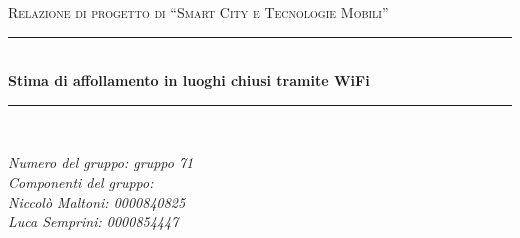 \begin{titlepage}
  \newcommand{\HRule}{\rule{\linewidth}{0.5mm}}

  \center

  \textsc{\Large Relazione di progetto di ``Smart City e Tecnologie Mobili''}\\[0.5cm]

  \HRule \\[0.4cm]
  { \huge \bfseries Stima di affollamento in luoghi chiusi tramite WiFi}\\[0.4cm]
  \HRule \\[1.5cm]

  \vfill

  \begin{flushleft}
  \emph{Numero del gruppo: gruppo 71}\\[1cm]
  \emph{%
    Componenti del gruppo:\\%
    Niccolò Maltoni: 0000840825\\%
    Luca Semprini: 0000854447%
  }\\[3cm]
  \end{flushleft}
\end{titlepage}
